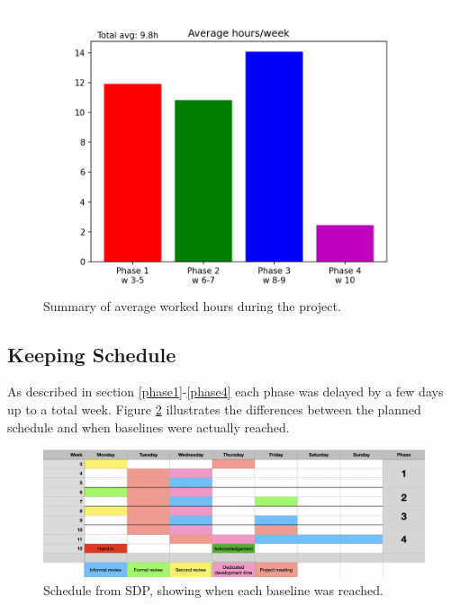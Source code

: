 \documentclass{article}
\begin{document}
        \begin{figure}[!htb]
            \centering
              \includegraphics[width=\linewidth]{images/final.png}
              \caption{Summary of average worked hours during the project.}\label{fig:final}
            \endminipage\hfill
        \end{figure}

    \subsection{Keeping Schedule}
        As described in section \ref{phase1}-\ref{phase4} each phase was
        delayed by a few days up to a total week. Figure \ref{fig:schedule}
        illustrates the differences between the planned schedule and when
        baselines were actually reached.
        
        \begin{figure}[!htb]
            \centering
              \includegraphics[width=\linewidth]{images/schedule_after.png}
              \caption{Schedule from SDP, showing when each baseline was reached.}\label{fig:schedule}
            \endminipage\hfill
        \end{figure}
      
\end{document}
